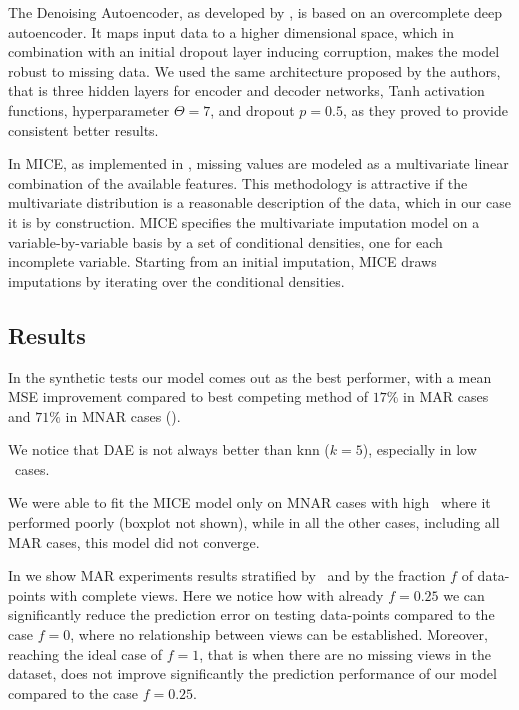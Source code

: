The Denoising Autoencoder, as developed by \cite{dae}, is based on an overcomplete deep autoencoder.
It maps input data to a higher dimensional space, which in combination with an initial dropout layer inducing corruption, makes the model robust to missing data.
We used the same architecture proposed by the authors, that is three hidden layers for encoder and decoder networks, Tanh activation functions, hyperparameter $\Theta=7$, and dropout $p=0.5$, as they proved to provide consistent better results.

In MICE, as implemented in \cite{mice}, missing values are modeled as a multivariate linear combination of the available features.
This methodology is attractive if the multivariate distribution is a reasonable description of the data, which in our case it is by construction.
MICE specifies the multivariate imputation model on a variable-by-variable basis by a set of conditional densities, one for each incomplete variable.
Starting from an initial imputation, MICE draws imputations by iterating over the conditional densities.

\subsection{Results}


In the synthetic tests our model comes out as the best performer, with a mean MSE improvement compared to best competing method of $17\%$ in MAR cases and $71\%$ in MNAR cases ().

We notice that DAE is not always better than knn ($k=5$), especially in low \snr\ cases.

We were able to fit the MICE model only on MNAR cases with high \snr\, where it performed poorly (boxplot not shown), while in all the other cases, including all MAR cases, this model did not converge.

In  we show MAR experiments results stratified by \snr\ and by the fraction $f$ of data-points with complete views.
Here we notice how with already $f = 0.25$ we can significantly reduce the prediction error on testing data-points compared to the case $f=0$, where no relationship between views can be established.
Moreover, reaching the ideal case of $f=1$, that is when there are no missing views in the dataset, does not improve significantly the prediction performance of our model compared to the case $f = 0.25$.

